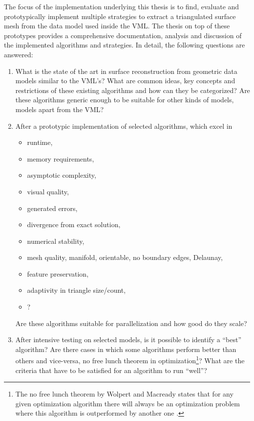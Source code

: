 The focus of the implementation underlying this thesis is to find, evaluate and prototypically implement multiple strategies to extract a triangulated surface mesh from the data model used inside the VML.
The thesis on top of these prototypes provides a comprehensive documentation, analysis and discussion of the implemented algorithms and strategies.
In detail, the following questions are answered:

\begin{enumerate}
	\item What is the state of the art in surface reconstruction from geometric data models similar to the VML's?
	What are common ideas, key concepts and restrictions of these existing algorithms and how can they be categorized?
	Are these algorithms generic enough to be suitable for other kinds of models, \ie models apart from the VML?
	
	\item After a prototypic implementation of selected algorithms, which excel in
	\begin{itemize}
		\item runtime,
		\item memory requirements,
		\item asymptotic complexity,
		\item visual quality,
		\item generated errors,
		\item divergence from exact solution,
		\item numerical stability,
		\item mesh quality, \eg manifold, orientable, no boundary edges, Delaunay,
		\item feature preservation,
		\item adaptivity in triangle size/count,
		\item \etc?
	\end{itemize} 
	Are these algorithms suitable for parallelization and how good do they scale?
	
	\item After intensive testing on selected models, is it possible to identify a \enquote{best} algorithm?
	Are there cases in which some algorithms perform better than others and vice-versa, \cf no free lunch theorem in optimization\footnote{The no free lunch theorem by Wolpert and Macready states that for any given optimization algorithm there will always be an optimization problem where this algorithm is outperformed by another one \cite{no_free_lunch}.}?
	What are the criteria that have to be satisfied for an algorithm to run \enquote{well}?
\end{enumerate}


